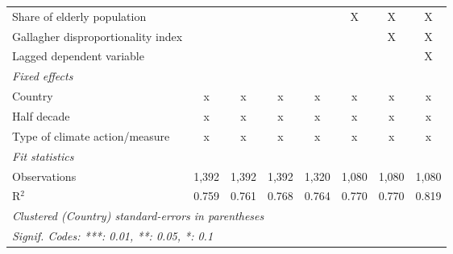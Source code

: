 \begin{tabular}{lccccccc}
   Share of elderly population                                                                 &         &         &         &         & X             & X             & X\\  
   Gallagher disproportionality index                                                          &         &         &         &         &               & X             & X\\  
   Lagged dependent variable                                                                   &         &         &         &         &               &               & X\\  
   \emph{Fixed effects}\\
   Country                                                                                     & x       & x       & x       & x       & x             & x             & x\\  
   Half decade                                                                                 & x       & x       & x       & x       & x             & x             & x\\  
   Type of climate action/measure                                                              & x       & x       & x       & x       & x             & x             & x\\  
   \midrule \emph{Fit statistics}\\
   Observations                                                                                & 1,392   & 1,392   & 1,392   & 1,320   & 1,080         & 1,080         & 1,080\\  
   R$^2$                                                                                       & 0.759   & 0.761   & 0.768   & 0.764   & 0.770         & 0.770         & 0.819\\  
   \midrule
   \multicolumn{8}{l}{\emph{Clustered (Country) standard-errors in parentheses}}\\
   \multicolumn{8}{l}{\emph{Signif. Codes: ***: 0.01, **: 0.05, *: 0.1}}\\
\end{tabular}
\par\endgroup


